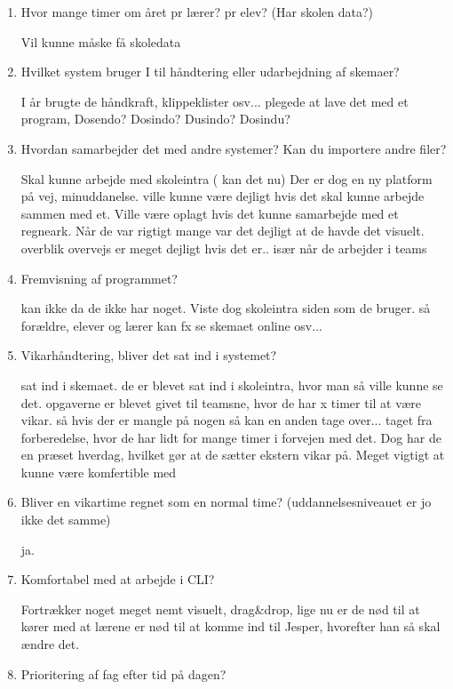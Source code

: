 \begin{enumerate}
	\item Hvor mange timer om året pr lærer? pr elev? (Har skolen data?)
	
	Vil kunne måske få skoledata
	
	\item Hvilket system bruger I til håndtering eller udarbejdning af skemaer?

	I år brugte de håndkraft, klippeklister osv... plegede at lave det med et program, Dosendo? Dosindo? Dusindo? Dosindu? 
	
	\item Hvordan samarbejder det med andre systemer? Kan du importere andre filer?
	
	Skal kunne arbejde med skoleintra ( kan det nu) Der er dog en ny platform på vej, minuddanelse. ville kunne være dejligt hvis det skal kunne arbejde sammen med et. Ville være oplagt hvis det kunne samarbejde med et regneark. Når de var rigtigt mange var det dejligt at de havde det visuelt. overblik overvejs er meget dejligt hvis det er.. især når de arbejder i teams
	
	\item Fremvisning af programmet?
	
	kan ikke da de ikke har noget. Viste dog skoleintra siden som de bruger. så forældre, elever og lærer kan fx se skemaet online osv... 
	
	\item Vikarhåndtering, bliver det sat ind i systemet?
	
	sat ind i skemaet. de er blevet sat ind i skoleintra, hvor man så ville kunne se det. opgaverne er blevet givet til teamsne, hvor de har x timer til at være vikar. så hvis der er mangle på nogen så kan en anden tage over... taget fra forberedelse, hvor de har lidt for mange timer i forvejen med det. Dog har de en præset hverdag, hvilket gør at de sætter ekstern vikar på. Meget vigtigt at kunne være komfertible med 
	
	\item Bliver en vikartime regnet som en normal time? (uddannelsesniveauet er jo ikke det samme)
	
	ja.
	
	\item Komfortabel med at arbejde i CLI?
	
	Fortrækker noget meget nemt visuelt, drag\&drop, lige nu er de nød til at kører med at lærene er nød til at komme ind til Jesper, hvorefter han så skal ændre det.  
	
	\item Prioritering af fag efter tid på dagen?
	

\end{enumerate}
